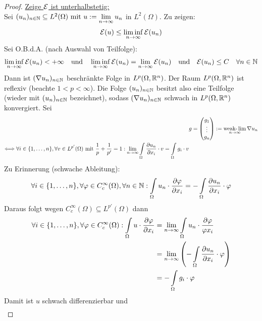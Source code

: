\begin{beispiel}
\begin{proof}
\underline{Zeige $\mathcal{E}$ ist unterhalbstetig:}\\
Sei $(u_n)_{n\in\mathbb{N}}\subseteq L^2(\Omega)\text{ mit } u:=\lim\limits_{n\to\infty} u_n$ in $L^2(\Omega)$. Zu zeigen:
\begin{align*}
\mathcal{E}(u)\leq\liminf\limits_{n\to\infty}\mathcal{E}(u_n)
\end{align*}
Sei O.B.d.A. (nach Auswahl von Teilfolge):
\begin{align*}
\liminf\limits_{n\to\infty}\mathcal{E}(u_n)<+\infty
\quad\text{und}\quad
\liminf\limits_{n\to\infty}\mathcal{E}(u_n)=\lim\limits_{n\to\infty}\mathcal{E}(u_n)
\quad\text{und}\quad
\mathcal{E}(u_n)\leq C\quad\forall n\in\mathbb{N}
\end{align*}
Dann ist $(\nabla u_n)_{n\in\mathbb{N}}$ beschränkte Folge in $L^p(\Omega,\mathbb{R}^n)$. Der Raum $L^p(\Omega,\mathbb{R}^n)$ ist reflexiv (beachte $1<p<\infty$). Die Folge $(u_n)_{n\in\mathbb{N}}$ besitzt also eine Teilfolge (wieder mit $(u_n)_{n\in\mathbb{N}}$ bezeichnet), sodass $(\nabla u_n)_{n\in\mathbb{N}}$ schwach in $L^p(\Omega,\mathbb{R}^n)$ konvergiert. Sei
\begin{align*}
&g=\begin{pmatrix}
g_1\\ \vdots\\ g_n
\end{pmatrix}:=\operatorname*{\text{weak-}\lim}\limits_{n\to\infty}\nabla u_n\\
\Longleftrightarrow\forall i\in\lbrace1,\ldots,n\rbrace,\forall v\in L^{p'}(\Omega)\text{ mit }\frac{1}{p}+\frac{1}{p'}=1:
\lim\limits_{n\to\infty}\int\limits_\Omega\frac{\partial u_n}{\partial x_i}\cdot v=\int\limits_\Omega g_i\cdot v
\end{align*}
Zu Erinnerung (schwache Ableitung):
\begin{align*}
\forall i\in\lbrace 1,\ldots,n\rbrace,\forall\varphi\in C_c^\infty(\Omega),\forall n\in\mathbb{N}:
\int\limits_\Omega u_n\cdot\frac{\partial\varphi}{\partial x_i}=-\int\limits_\Omega\frac{\partial u_n}{\partial x_i}\cdot\varphi
\end{align*}
Daraus folgt wegen $C_c^\infty(\Omega)\subseteq L^{p'}(\Omega)$ dann
\begin{align*}
\forall i\in\lbrace1,\ldots,n\rbrace,\forall\varphi\in C_c ^\infty(\Omega):
\int\limits_\Omega u\cdot\frac{\partial\varphi}{\partial x_i}
&=\lim\limits_{n\to\infty}\int\limits_\Omega u_n\cdot\frac{\partial\varphi}{\varphi x_i}\\
&=\lim\limits_{n\to\infty}\left(-\int\limits_\Omega\frac{\partial u_n}{\partial x_i}\cdot\varphi\right)\\
&=-\int\limits_\Omega g_i\cdot\varphi
\end{align*}
Damit ist $u$ schwach differenzierbar und 
\begin{align*}

\end{align*}
\end{proof}
\end{beispiel}
